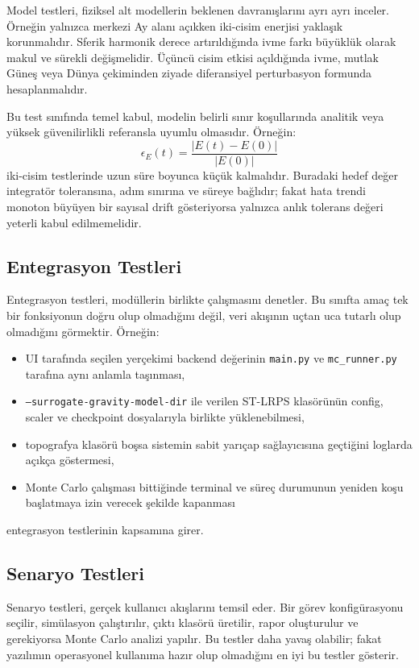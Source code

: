 Model testleri, fiziksel alt modellerin beklenen davranışlarını ayrı ayrı inceler. Örneğin yalnızca merkezi Ay alanı açıkken iki-cisim enerjisi yaklaşık korunmalıdır. Sferik harmonik derece artırıldığında ivme farkı büyüklük olarak makul ve sürekli değişmelidir. Üçüncü cisim etkisi açıldığında ivme, mutlak Güneş veya Dünya çekiminden ziyade diferansiyel perturbasyon formunda hesaplanmalıdır.

Bu test sınıfında temel kabul, modelin belirli sınır koşullarında analitik veya yüksek güvenilirlikli referansla uyumlu olmasıdır. Örneğin:
\[
\epsilon_E(t)
=
\frac{|E(t)-E(0)|}{|E(0)|}
\]
iki-cisim testlerinde uzun süre boyunca küçük kalmalıdır. Buradaki hedef değer integratör toleransına, adım sınırına ve süreye bağlıdır; fakat hata trendi monoton büyüyen bir sayısal drift gösteriyorsa yalnızca anlık tolerans değeri yeterli kabul edilmemelidir.

\subsection{Entegrasyon Testleri}

Entegrasyon testleri, modüllerin birlikte çalışmasını denetler. Bu sınıfta amaç tek bir fonksiyonun doğru olup olmadığını değil, veri akışının uçtan uca tutarlı olup olmadığını görmektir. Örneğin:

\begin{itemize}
    \item UI tarafında seçilen yerçekimi backend değerinin \texttt{main.py} ve \texttt{mc\_runner.py} tarafına aynı anlamla taşınması,
    \item \texttt{--surrogate-gravity-model-dir} ile verilen ST-LRPS klasörünün config, scaler ve checkpoint dosyalarıyla birlikte yüklenebilmesi,
    \item topografya klasörü boşsa sistemin sabit yarıçap sağlayıcısına geçtiğini loglarda açıkça göstermesi,
    \item Monte Carlo çalışması bittiğinde terminal ve süreç durumunun yeniden koşu başlatmaya izin verecek şekilde kapanması
\end{itemize}
entegrasyon testlerinin kapsamına girer.

\subsection{Senaryo Testleri}

Senaryo testleri, gerçek kullanıcı akışlarını temsil eder. Bir görev konfigürasyonu seçilir, simülasyon çalıştırılır, çıktı klasörü üretilir, rapor oluşturulur ve gerekiyorsa Monte Carlo analizi yapılır. Bu testler daha yavaş olabilir; fakat yazılımın operasyonel kullanıma hazır olup olmadığını en iyi bu testler gösterir.

